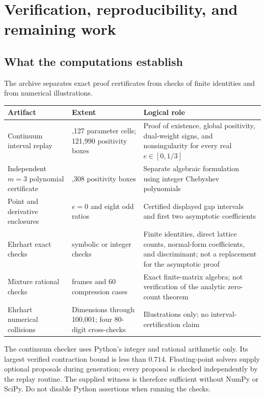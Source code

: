 \section{Verification, reproducibility, and remaining work}
\label{sec:verification}

\subsection{What the computations establish}
The archive separates exact proof certificates from checks of finite
identities and from numerical illustrations.
\begin{center}
\small
\begin{tabular}{@{}>{\raggedright\arraybackslash}p{}>{\raggedright\arraybackslash}p{}>{\raggedright\arraybackslash}p{}@{}}
\toprule
Artifact & Extent & Logical role \\
\midrule
Continuum interval replay &
1,127 parameter cells; 121,990 positivity boxes &
Proof of existence, global positivity, dual-weight signs, and
nonsingularity for every real $e\in[0,1/3]$ \\
\addlinespace
Independent $m=3$ polynomial certificate &
3,308 positivity boxes &
Separate algebraic formulation using integer Chebyshev polynomials \\
\addlinespace
Point and derivative enclosures &
$e=0$ and eight odd ratios &
Certified displayed gap intervals and first two asymptotic coefficients \\
\addlinespace
Ehrhart exact checks &
172 symbolic or integer checks &
Finite identities, direct lattice counts, normal-form coefficients,
and discriminant; not a replacement for the asymptotic proof \\
\addlinespace
Mixture rational checks &
400 frames and 60 compression cases &
Exact finite-matrix algebra; not verification of the analytic
zero-count theorem \\
\addlinespace
Ehrhart numerical collisions &
Dimensions through 100,001; four 80-digit cross-checks &
Illustrations only; no interval-certification claim \\
\bottomrule
\end{tabular}
\end{center}

The continuum checker uses Python's integer and rational arithmetic only.
Its largest verified contraction bound is less than $0.714$.
Floating-point solvers supply optional proposals during generation;
every proposal is checked independently by the replay routine.
The supplied witness is therefore sufficient without NumPy or SciPy.
Do not disable Python assertions when running the checks.


